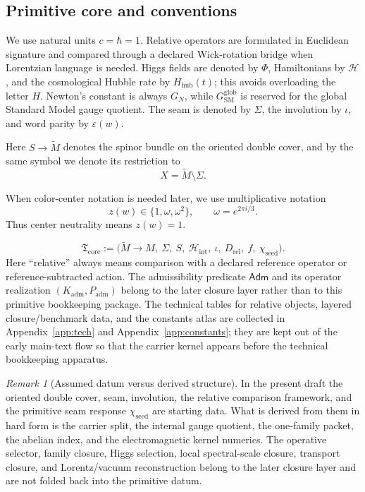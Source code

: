 \documentclass[11pt,a4paper]{article}
\theoremstyle{definition}
\theoremstyle{remark}
\newtheorem*{remark}{Remark}
\newcommand{\Seam}{\Sigma}
\newcommand{\inv}{\iota}
\newcommand{\SM}{\mathrm{SM}}
\newcommand{\Hhub}{H_{\mathrm{hub}}}
\newcommand{\Hint}{\mathcal H_{\mathrm{int}}}
\newcommand{\Kadm}{K_{\mathrm{adm}}}
\newcommand{\chiseed}{\chi_{\mathrm{seed}}}
\newcommand{\Tcore}{\mathfrak T_{\mathrm{core}}}
\newcommand{\Padm}{P_{\mathrm{adm}}}
\begin{document}
\subsection{Primitive core and conventions}

We use natural units $c=\hbar=1$. Relative operators are formulated in Euclidean signature and compared through a declared Wick-rotation bridge when Lorentzian language is needed. Higgs fields are denoted by $\Phi$, Hamiltonians by $\mathcal H$, and the cosmological Hubble rate by $\Hhub(t)$; this avoids overloading the letter $H$. Newton's constant is always $G_N$, while $G_{\SM}^{\mathrm{glob}}$ is reserved for the global Standard Model gauge quotient. The seam is denoted by $\Seam$, the involution by $\inv$, and word parity by $\varepsilon(w)$.

Here $S\to \widetilde M$ denotes the spinor bundle on the oriented double cover, and by the same symbol we denote its restriction to
\[
X=\widetilde M\setminus\Seam.
\]

When color-center notation is needed later, we use multiplicative notation
\[
z(w)\in\{1,\omega,\omega^2\},
\qquad
\omega=e^{2\pi i/3}.
\]
Thus center neutrality means $z(w)=1$.

\[
\Tcore
:=
\bigl(
\widetilde M\to M,\ \Seam,\ S,\ \Hint,\ \inv,\ D_{\mathrm{rel}},\ f,\ \chiseed
\bigr).
\]
Here \enquote{relative} always means comparison with a declared reference operator or reference-subtracted action. The admissibility predicate $\mathsf{Adm}$ and its operator realization $(\Kadm,\Padm)$ belong to the later closure layer rather than to this primitive bookkeeping package. The technical tables for relative objects, layered closure/benchmark data, and the constants atlas are collected in Appendix~\ref{app:tech} and Appendix~\ref{app:constants}; they are kept out of the early main-text flow so that the carrier kernel appears before the technical bookkeeping apparatus.

\begin{remark}[Assumed datum versus derived structure]
In the present draft the oriented double cover, seam, involution, the relative comparison framework, and the primitive seam response $\chiseed$ are starting data. What is derived from them in hard form is the carrier split, the internal gauge quotient, the one-family packet, the abelian index, and the electromagnetic kernel numerics. The operative selector, family closure, Higgs selection, local spectral-scale closure, transport closure, and Lorentz/vacuum reconstruction belong to the later closure layer and are not folded back into the primitive datum.
\end{remark}
\end{document}
